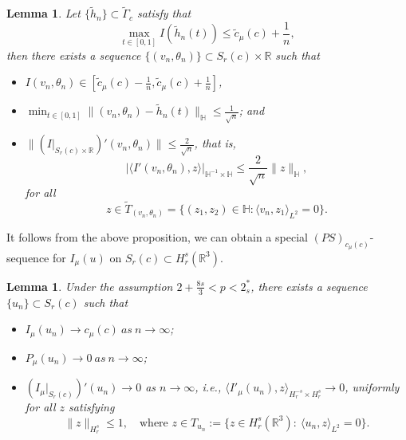 \documentclass[11pt]{article}
\numberwithin{equation}{section}
\newtheorem{lemma}[theorem]{Lemma}
\begin{document}
\begin{lemma}\label{lem5.4} 
Let $\{\tilde{h}_n\}\subset \tilde{\Gamma}_c $ satisfy that
$$
\max_{t\in[0,1]}I(\tilde{h}_n(t))\leq \tilde{c}_\mu (c)+\frac{1}{n},
$$
then there exists a sequence $\{(v_n, \theta_n)\}\subset S_{r}(c)\times \mathbb{R}$ 
such that
\begin{itemize}
\item[(i)] $I{(v_n, \theta_n)}\in [\tilde{c}_\mu (c)-\frac{1}{n}, 
 \tilde{c}_\mu (c)+\frac{1}{n}]$,
 
\item[(ii)] $\min_{t\in[0,1]}\|(v_n, \theta_n)-\tilde{h}_n(t)\|_{\mathbb{H}}
\leq \frac{1}{\sqrt{n}}$; and

\item[(iii)] $\|(I|_{S_{r}(c)\times \mathbb{R}})'(v_n, \theta_n)\|
 \leq \frac{2}{\sqrt{n}}$, that is,
$$
|\langle I'(v_n, \theta_n), z\rangle|_{\mathbb{H}^{-1}\times \mathbb{H}}
\leq \frac{2}{\sqrt{n}} \|z\|_{\mathbb{H}},
$$
for all
$$ 
{z\in {\tilde{T}_{(v_n, \theta_n)}}}=\{(z_1, z_2)\in \mathbb{H}: 
{\langle v_n, z_1\rangle}_{L^2}=0\}.
$$
\end{itemize}
\end{lemma}


It follows from the above proposition, we can obtain a special 
$(PS)_{{c}_\mu (c)}$-sequence for $I_\mu(u)$ on $S_{r}(c)\subset H^s_r(\mathbb{R}^3)$.

\begin{lemma}\label{lem5.5} 
Under the  assumption $2+\frac{8s}{3}<p<2^*_s$, there exists a sequence
$\{u_n\} \subset S_{r}(c)$ such that
\begin{itemize}
\item[(1)] $I_\mu(u_n)\to c_\mu(c) ~as~ n\to \infty$;

\item[(2)] $P_\mu(u_n)\to 0 ~as~ n\to \infty$;

\item[(3)] $(I_\mu|_{S_{r}(c)})'(u_n)\to 0$  as $n\to \infty$, i.e., 
$\langle I'_\mu(u_n), z\rangle_{{H^{-s}_r} \times H^s_r} \to 0$, 
uniformly for all $z$ satisfying
$$
\|z\|_{H^s_r}\leq 1,\quad \text{where } z\in T_{u_n} 
:=\{z\in {H^s_r(\mathbb{R}^3)}:~\langle u_n,z \rangle_{L^2}=0\}.
$$
\end{itemize}
\end{lemma}
\end{document}
